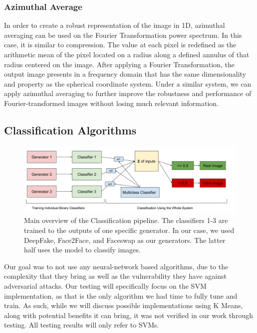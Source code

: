 \documentclass[11pt,twocolumn,letterpaper]{article}
\begin{document}
\subsubsection{Azimuthal Average}
In order to create a robust representation of the image in 1D, azimuthal averaging can be used on the Fourier Transformation power spectrum. In this case, it is similar to compression. The value at each pixel is redefined as the arithmetic mean of the pixel located on a radius along a defined annulus of that radius centered on the image. After applying a Fourier Transformation, the output image presents in a frequency domain that has the same dimensionality and property as the spherical coordinate system. Under a similar system, we can apply azimuthal averaging to further improve the robustness and performance of Fourier-transformed images without losing much relevant information. 

\subsection{Classification Algorithms}
\begin{figure}
    \includegraphics[width=\textwidth]{Classification-Pipeline}
    \caption{Main overview of the Classification pipeline. The classifiers 1-3 are trained to the outputs of one specific generator. In our case, we used DeepFake, Face2Face, and Faceswap as our generators. The latter half uses the model to classify images.}
\end{figure} 
Our goal was to not use any neural-network based algorithms, due to the complexity that they bring as well as the vulnerability they have against adversarial attacks. Our testing will specifically focus on the SVM implementation, as that is the only algorithm we had time to fully tune and train. As such, while we will discuss possible implementations using K Means, along with potential benefits it can bring, it was not verified in our work through testing. All testing results will only refer to SVMs.
\end{document}
